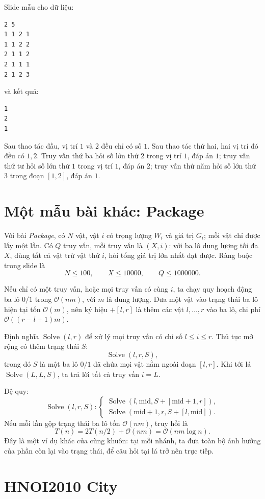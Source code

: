 \documentclass[11pt]{article}
\newcommand{\Oh}{\mathcal{O}}
\newcommand{\midp}{\mathrm{mid}}
\newcommand{\Solve}{\operatorname{Solve}}
\begin{document}
Slide mẫu cho dữ liệu:
\begin{verbatim}
2 5
1 1 2 1
1 1 2 2
2 1 1 2
2 1 1 1
2 1 2 3
\end{verbatim}
và kết quả:
\begin{verbatim}
1
2
1
\end{verbatim}
Sau thao tác đầu, vị trí \(1\) và \(2\) đều chỉ có số \(1\). Sau thao tác
thứ hai, hai vị trí đó đều có \(1,2\). Truy vấn thứ ba hỏi số lớn thứ \(2\)
trong vị trí \(1\), đáp án \(1\); truy vấn thứ tư hỏi số lớn thứ \(1\) trong
vị trí \(1\), đáp án \(2\); truy vấn thứ năm hỏi số lớn thứ \(3\) trong đoạn
\([1,2]\), đáp án \(1\).

\section{Một mẫu bài khác: Package}

Với bài \emph{Package}, có \(N\) vật, vật \(i\) có trọng lượng \(W_i\) và giá
trị \(G_i\); mỗi vật chỉ được lấy một lần. Có \(Q\) truy vấn, mỗi truy vấn là
\((X,i)\): với ba lô dung lượng tối đa \(X\), dùng tất cả vật trừ vật thứ
\(i\), hỏi tổng giá trị lớn nhất đạt được. Ràng buộc trong slide là
\[
  N\le 100,\qquad X\le 10000,\qquad Q\le 1000000.
\]

Nếu chỉ có một truy vấn, hoặc mọi truy vấn có cùng \(i\), ta chạy quy hoạch
động ba lô \(0/1\) trong \(\Oh(nm)\), với \(m\) là dung lượng. Đưa một vật
vào trạng thái ba lô hiện tại tốn \(\Oh(m)\), nên ký hiệu \(+[l,r]\) là thêm
các vật \(l,\ldots,r\) vào ba lô, chi phí \(\Oh((r-l+1)m)\).

Định nghĩa \(\Solve(l,r)\) để xử lý mọi truy vấn có chỉ số \(l\le i\le r\).
Thủ tục mở rộng có thêm trạng thái \(S\):
\[
  \Solve(l,r,S),
\]
trong đó \(S\) là một ba lô \(0/1\) đã chứa mọi vật nằm ngoài đoạn \([l,r]\).
Khi tới lá \(\Solve(L,L,S)\), ta trả lời tất cả truy vấn \(i=L\).

Đệ quy:
\[
  \Solve(l,r,S):
  \begin{cases}
    \Solve(l,\midp,S+[\midp+1,r]),\\
    \Solve(\midp+1,r,S+[l,\midp]).
  \end{cases}
\]
Nếu mỗi lần gộp trạng thái ba lô tốn \(\Oh(nm)\), truy hồi là
\[
  T(n)=2T(n/2)+\Oh(nm)=\Oh(nm\log n).
\]
Đây là một ví dụ khác của cùng khuôn: tại mỗi nhánh, ta đưa toàn bộ ảnh
hưởng của phần còn lại vào trạng thái, để câu hỏi tại lá trở nên trực tiếp.

\section{HNOI2010 City}
\end{document}
